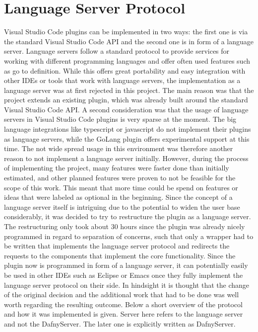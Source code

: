 \section{Language Server Protocol}\label{langserver}
Visual Studio Code plugins can be implemented in two ways: the first one is via the standard Visual Studio Code API and the second one is in form of a language server. Language servers follow a standard protocol to provide services for working with different programming languages and offer often used features such as go to definition. While this offers great portability and easy integration with other IDEs or tools that work with language servers, the implementation as a language server was at first rejected in this project. \newline
The main reason was that the project extends an existing plugin, which was already built around the standard Visual Studio Code API. A second consideration was that the usage of language servers in Visual Studio Code plugins is very sparse at the moment. The big language integrations like typescript or javascript do not implement their plugins as language servers, while the GoLang plugin offers experimental support at this time. The not wide spread usage in this environment was therefore another reason to not implement a language server initially. \newline
However, during the process of implementing the project, many features were faster done than initially estimated, and other planned features were proven to not be feasible for the scope of this work. This meant that more time could be spend on features or ideas that were labeled as optional in the beginning. Since the concept of a language server itself is intriguing due to the potential to widen the user base considerably, it was decided to try to restructure the plugin as a language server. \newline
The restructuring only took about 30 hours since the plugin was already nicely programmed in regard to separation of concerns, such that only a wrapper had to be written that implements the language server protocol and redirects the requests to the components that implement the core functionality. 
Since the plugin now is programmed in form of a language server, it can potentially easily be used in other IDEs such as Eclipse or Emacs once they fully implement the language server protocol on their side. In hindsight it is thought that the change of the original decision and the additional work that had to be done was well worth regarding the resulting outcome. \newline
Below a short overview of the protocol and how it was implemented is given. Server here refers to the language server and not the DafnyServer. The later one is explicitly written as DafnyServer.

